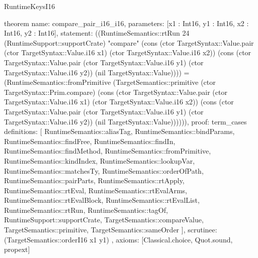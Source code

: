 \begin{lexlean}{RuntimeKeysI16}
\begin{semanticmodule}
theorem{
  name: compare_pair_i16_i16,
  parameters: [x1 : Int16, y1 : Int16, x2 : Int16, y2 : Int16],
  statement: ((RuntimeSemantics::rtRun 24 (RuntimeSupport::supportCrate) "compare" (cons (ctor TargetSyntax::Value.pair (ctor TargetSyntax::Value.i16 x1) (ctor TargetSyntax::Value.i16 x2)) (cons (ctor TargetSyntax::Value.pair (ctor TargetSyntax::Value.i16 y1) (ctor TargetSyntax::Value.i16 y2)) (nil TargetSyntax::Value)))) = (RuntimeSemantics::fromPrimitive (TargetSemantics::primitive (ctor TargetSyntax::Prim.compare) (cons (ctor TargetSyntax::Value.pair (ctor TargetSyntax::Value.i16 x1) (ctor TargetSyntax::Value.i16 x2)) (cons (ctor TargetSyntax::Value.pair (ctor TargetSyntax::Value.i16 y1) (ctor TargetSyntax::Value.i16 y2)) (nil TargetSyntax::Value)))))),
  proof: term_cases{
    definitions: [
      RuntimeSemantics::aliasTag,
      RuntimeSemantics::bindParams,
      RuntimeSemantics::findFree,
      RuntimeSemantics::findIn,
      RuntimeSemantics::findMethod,
      RuntimeSemantics::fromPrimitive,
      RuntimeSemantics::kindIndex,
      RuntimeSemantics::lookupVar,
      RuntimeSemantics::matchesTy,
      RuntimeSemantics::orderOfPath,
      RuntimeSemantics::pairParts,
      RuntimeSemantics::rtApply,
      RuntimeSemantics::rtEval,
      RuntimeSemantics::rtEvalArms,
      RuntimeSemantics::rtEvalBlock,
      RuntimeSemantics::rtEvalList,
      RuntimeSemantics::rtRun,
      RuntimeSemantics::tagOf,
      RuntimeSupport::supportCrate,
      TargetSemantics::compareValue,
      TargetSemantics::primitive,
      TargetSemantics::sameOrder
    ],
    scrutinee: (TargetSemantics::orderI16 x1 y1)
  },
  axioms: [Classical.choice, Quot.sound, propext]
}


\end{semanticmodule}
\end{lexlean}
